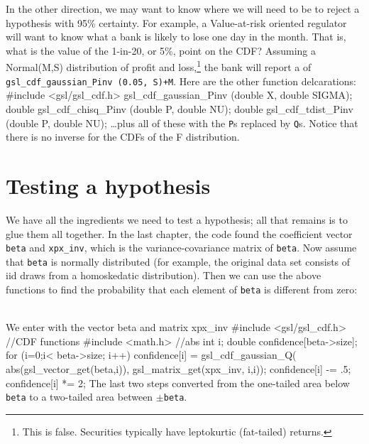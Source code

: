 In the other direction, we may want to know where we will need to be to reject a hypothesis with 95\%
certainty. For example, a Value-at-risk oriented regulator will want to know what a bank is likely to lose 
one day in the month. That is, what is the value of the 1-in-20, or 5\%, point on the CDF?
Assuming a Normal(M,S) distribution of profit and loss,\footnote{This is false. Securities
typically have leptokurtic (fat-tailed) returns.} the bank will report a  of {\tt
gsl\_cdf\_gaussian\_Pinv (0.05, S)+M}. Here are the other function delcarations:
#include <gsl/gsl_cdf.h>
gsl_cdf_gaussian_Pinv (double X, double SIGMA);
double gsl_cdf_chisq_Pinv (double P, double NU);
double gsl_cdf_tdist_Pinv (double P, double NU);
\dots plus all of these with the {\tt P}s replaced by {\tt Q}s.
Notice that there is no inverse for the CDFs of the F distribution.


\section{Testing a hypothesis}
We have all the ingredients we need to test a hypothesis; all that
remains is to glue them all together.  In the last chapter, the code
found the coefficient vector {\tt beta} and {\tt xpx\_inv}, which is the
variance-covariance matrix of {\tt beta}.  Now assume that {\tt beta}
is normally distributed (for example, the original data set consists
of iid draws from a homoskedatic distribution). Then we can use the
above functions to find the probability that each element of {\tt beta}
is different from zero:

\\We enter with the vector beta and matrix xpx_inv
#include <gsl/gsl_cdf.h>  //CDF functions
#include <math.h>         //abs
int i;
double confidence[beta->size];
for (i=0;i< beta->size; i++){
    confidence[i] = gsl_cdf_gaussian_Q( abs(gsl_vector_get(beta,i)), 
                         gsl_matrix_get(xpx_inv, i,i));
    confidence[i] -= .5;
    confidence[i] *= 2;
}
The last two steps converted from the one-tailed area below {\tt beta}
to a two-tailed area between $\pm${\tt beta}.

